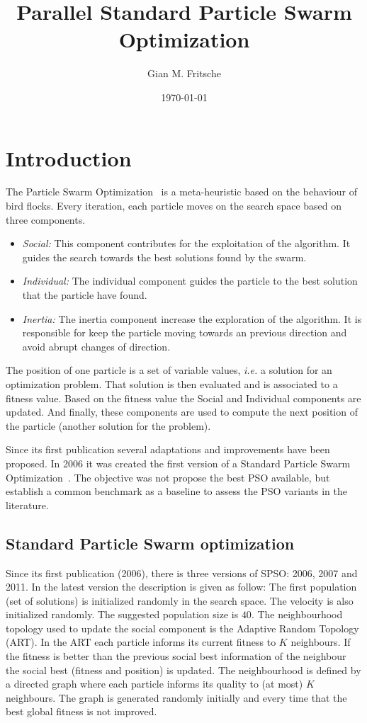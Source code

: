 \documentclass{article}
\title{Parallel Standard Particle Swarm Optimization}
\author{Gian M. Fritsche}
\date{\today}
\begin{document}
	\maketitle

	\section{Introduction}

	The Particle Swarm Optimization~\cite{PSO95} is a meta-heuristic based on the behaviour of bird flocks. Every iteration, each particle moves on the search space based on three components.

	\begin{itemize}
		\item {\em Social:} This component contributes for the exploitation of the algorithm.
		It guides the search towards the best solutions found by the swarm.
		\item {\em Individual:} The individual component guides the particle to the best solution that the particle have found.
		\item {\em Inertia:} The inertia component increase the exploration of the algorithm. It is responsible for keep the particle moving towards an previous direction and avoid abrupt changes of direction.
	\end{itemize}

	The position of one particle is a set of variable values, {\em i.e.} a solution for an optimization problem. That solution is then evaluated and is associated to a fitness value. Based on the fitness value the Social and Individual components are updated.
	And finally, these components are used to compute the next position of the particle (another solution for the problem).

	Since its first publication several adaptations and improvements have been proposed.
	In 2006 it was created the first version of a Standard Particle Swarm Optimization~\cite{SPSO}. The objective was not propose the best PSO available, but establish a common benchmark as a baseline to assess the PSO variants in the literature.

	\subsection {Standard Particle Swarm optimization}

	Since its first publication (2006), there is three versions of SPSO: 2006, 2007 and 2011.
	In the latest version the description is given as follow:
	The first population (set of solutions) is initialized randomly in the search space. The velocity is also initialized randomly. The suggested population size is $40$. The neighbourhood topology used to update the social component is the Adaptive Random Topology (ART).
	In the ART each particle informs its current fitness to $K$ neighbours. If the fitness is better than the previous social best information of the neighbour the social best (fitness and position) is updated. The neighbourhood is defined by a directed graph where each particle informs its quality to (at most) $K$ neighbours. The graph is generated randomly initially and every time that the best global fitness is not improved.
\end{document}
